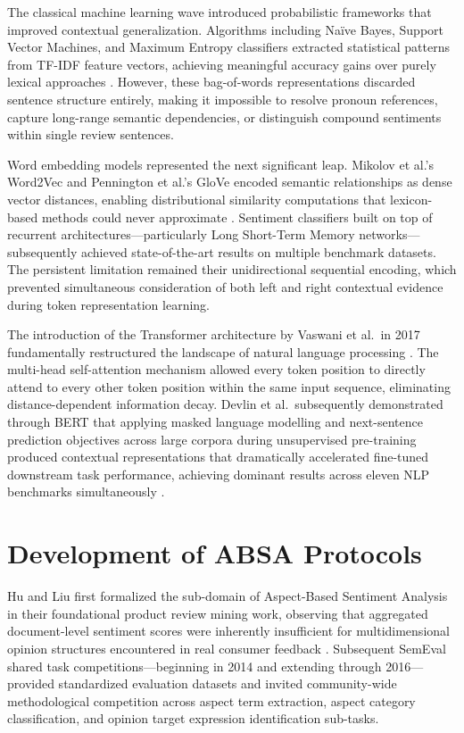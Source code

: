 \documentclass[12pt,a4paper]{report}
\begin{document}
The classical machine learning wave introduced probabilistic frameworks that improved contextual generalization. Algorithms including Naïve Bayes, Support Vector Machines, and Maximum Entropy classifiers extracted statistical patterns from TF-IDF feature vectors, achieving meaningful accuracy gains over purely lexical approaches \cite{pang2002thumbs}. However, these bag-of-words representations discarded sentence structure entirely, making it impossible to resolve pronoun references, capture long-range semantic dependencies, or distinguish compound sentiments within single review sentences.

Word embedding models represented the next significant leap. Mikolov et al.'s Word2Vec and Pennington et al.'s GloVe encoded semantic relationships as dense vector distances, enabling distributional similarity computations that lexicon-based methods could never approximate \cite{mikolov2013distributed,pennington2014glove}. Sentiment classifiers built on top of recurrent architectures—particularly Long Short-Term Memory networks—subsequently achieved state-of-the-art results on multiple benchmark datasets. The persistent limitation remained their unidirectional sequential encoding, which prevented simultaneous consideration of both left and right contextual evidence during token representation learning.

The introduction of the Transformer architecture by Vaswani et al.\ in 2017 fundamentally restructured the landscape of natural language processing \cite{vaswani2017attention}. The multi-head self-attention mechanism allowed every token position to directly attend to every other token position within the same input sequence, eliminating distance-dependent information decay. Devlin et al.\ subsequently demonstrated through BERT that applying masked language modelling and next-sentence prediction objectives across large corpora during unsupervised pre-training produced contextual representations that dramatically accelerated fine-tuned downstream task performance, achieving dominant results across eleven NLP benchmarks simultaneously \cite{devlin2019bert}.

\section{Development of ABSA Protocols}
Hu and Liu first formalized the sub-domain of Aspect-Based Sentiment Analysis in their foundational product review mining work, observing that aggregated document-level sentiment scores were inherently insufficient for multidimensional opinion structures encountered in real consumer feedback \cite{hu2004mining}. Subsequent SemEval shared task competitions—beginning in 2014 and extending through 2016—provided standardized evaluation datasets and invited community-wide methodological competition across aspect term extraction, aspect category classification, and opinion target expression identification sub-tasks.
\end{document}
